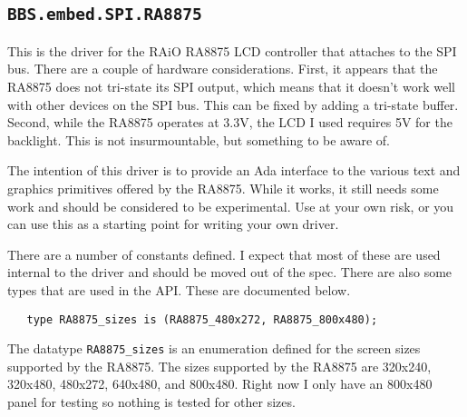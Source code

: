 \documentclass[10pt, openany]{book}
\newcommand{\package}[1]{\texttt{#1}}
\newcommand{\datatype}[1]{\texttt{#1}}
\begin{document}
\subsection{\package{BBS.embed.SPI.RA8875}}
This is the driver for the RAiO RA8875 LCD controller that attaches to the SPI bus\cite{RA8875}.  There are a couple of hardware considerations.  First, it appears that the RA8875 does not tri-state its SPI output, which means that it doesn't work well with other devices on the SPI bus.  This can be fixed by adding a tri-state buffer.  Second, while the RA8875 operates at 3.3V, the LCD I used requires 5V for the backlight.  This is not insurmountable, but something to be aware of.

The intention of this driver is to provide an Ada interface to the various text and graphics primitives offered by the RA8875.  While it works, it still needs some work and should be considered to be experimental.  Use at your own risk, or you can use this as a starting point for writing your own driver.

There are a number of constants defined.  I expect that most of these are used internal to the driver and should be moved out of the spec.  There are also some types that are used in the API.  These are documented below.

\begin{lstlisting}
   type RA8875_sizes is (RA8875_480x272, RA8875_800x480);
\end{lstlisting}
The datatype \datatype{RA8875\_sizes} is an enumeration defined for the screen sizes supported by the RA8875.  The sizes supported by the RA8875 are 320x240, 320x480, 480x272, 640x480, and 800x480.  Right now I only have an 800x480 panel for testing so nothing is tested for other sizes.
\end{document}
